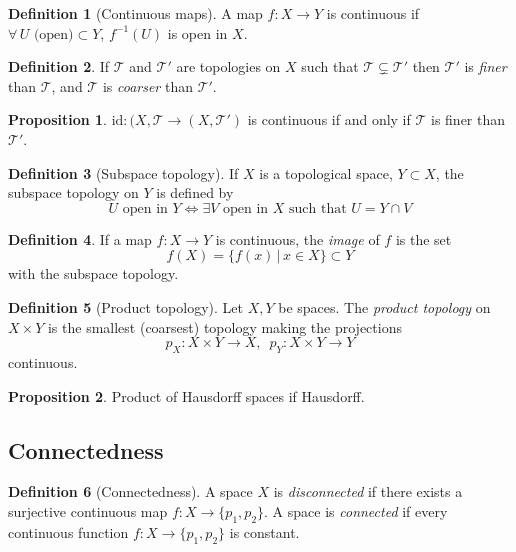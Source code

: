 \documentclass[a4paper,14pt]{extarticle}
\theoremstyle{definition}
\newtheorem*{definition}{Definition}
\newtheorem*{proposition}{Proposition}
\begin{document}
\begin{definition}[Continuous maps]
  A map $f:X\rightarrow Y$ is continuous if $\forall \,U\text{ (open)}\subset Y$,
  $f^{-1}(U)$ is open in $X$.
\end{definition}

\begin{definition}
  If $\mathcal{T}$ and $\mathcal{T}'$ are topologies on $X$ such that $\mathcal{T}\subsetneq\mathcal{T}'$ then $\mathcal{T}'$ is \emph{finer} than $\mathcal{T}$, and 
  $\mathcal{T}$ is \emph{coarser} than $\mathcal{T}'$.
\end{definition}

\begin{proposition}
  $\text{id}:(X,\mathcal{T}\rightarrow (X,\mathcal{T}')$ is continuous if and only if 
  $\mathcal{T}$ is finer than $\mathcal{T}'$.
\end{proposition}

\begin{definition}[Subspace topology]
  If $X$ is a topological space, $Y\subset X$, the subspace topology on $Y$ is defined by
  \[U\text{ open in } Y\iff \exists V\text{ open in }X \text{ such that }U=Y\cap V\]
\end{definition}

\begin{definition}
  If a map $f:X\rightarrow Y$ is continuous, the \emph{image} of $f$ is the set 
  \[f(X)=\{f(x)\,|\,x\in X\}\subset Y\] with the subspace topology.
\end{definition}

\begin{definition}[Product topology]
  Let $X, Y$ be spaces. The \emph{product topology} on $X\times Y$ is the smallest (coarsest)
  topology making the projections
  \[p_X:X\times Y\rightarrow X, \,\,\,p_Y:X\times Y\rightarrow Y\]
  continuous.
\end{definition}

\begin{proposition}
  Product of Hausdorff spaces if Hausdorff.
\end{proposition}

\subsection{Connectedness}
\begin{definition}[Connectedness]
  A space $X$ is \emph{disconnected} if there exists a surjective continuous map 
  $f:X\rightarrow\{p_1,p_2\}$. A space is \emph{connected} if every continuous function
  $f:X\rightarrow\{p_1,p_2\}$ is constant.
\end{definition}
\end{document}
